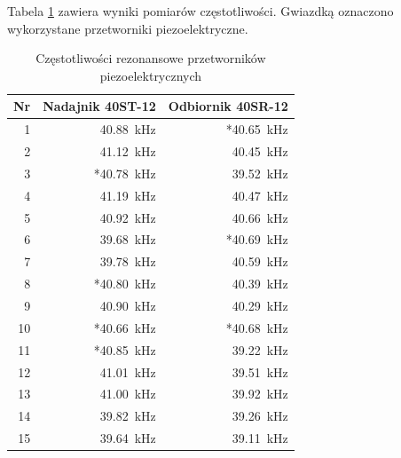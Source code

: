 Tabela \ref{table:czestotliwosci} zawiera wyniki pomiarów częstotliwości. Gwiazdką oznaczono wykorzystane przetworniki piezoelektryczne.

\begin{table}[t]
  \caption{Częstotliwości rezonansowe przetworników piezoelektrycznych}
  \label{table:czestotliwosci}
  \centering
  \begin{tabular}{|r|r|r|}
    \hline 
    Nr & Nadajnik 40ST-12 & Odbiornik 40SR-12\\
    \hline
    1  &   \SI{40,88}{kHz} & *\SI{40,65}{kHz} \\
    2  &   \SI{41,12}{kHz} &  \SI{40,45}{kHz} \\
    3  &  *\SI{40,78}{kHz} &  \SI{39,52}{kHz} \\
    4  &   \SI{41,19}{kHz} &  \SI{40,47}{kHz} \\
    5  &   \SI{40,92}{kHz} &  \SI{40,66}{kHz} \\
    6  &   \SI{39,68}{kHz} & *\SI{40,69}{kHz} \\
    7  &   \SI{39,78}{kHz} &  \SI{40,59}{kHz} \\
    8  &  *\SI{40,80}{kHz} &  \SI{40,39}{kHz} \\
    9  &   \SI{40,90}{kHz} &  \SI{40,29}{kHz} \\
    10 &  *\SI{40,66}{kHz} & *\SI{40,68}{kHz} \\
    11 &  *\SI{40,85}{kHz} &  \SI{39,22}{kHz} \\
    12 &   \SI{41,01}{kHz} &  \SI{39,51}{kHz} \\
    13 &   \SI{41,00}{kHz} &  \SI{39,92}{kHz} \\
    14 &   \SI{39,82}{kHz} &  \SI{39,26}{kHz} \\
    15 &   \SI{39,64}{kHz} &  \SI{39,11}{kHz} \\
    \hline
  \end{tabular}
\end{table}


